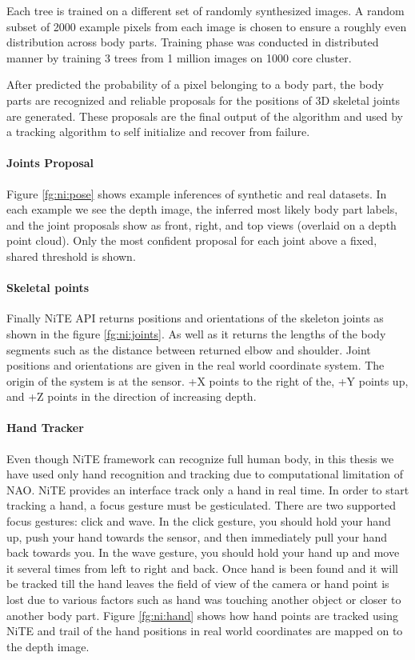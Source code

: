 

Each tree is trained on a different set of randomly synthesized images. A random subset of 2000 example pixels from each image is chosen to ensure a roughly even distribution across body parts. Training phase was conducted in distributed manner by training 3 trees from 1 million images on 1000 core cluster.

After predicted the probability of a pixel belonging to a body part, the body parts are recognized and reliable proposals for the positions of 3D skeletal joints are generated. These proposals are the final output of the algorithm and used by a tracking algorithm to self initialize and recover from failure.



\paragraph*{Joints Proposal} Figure \ref{fg:ni:pose} shows example inferences of synthetic and real datasets. In each example we see the depth image, the inferred most likely body part labels, and the joint proposals show as front, right, and top views (overlaid on a depth point cloud). Only the most confident proposal for each joint above a fixed, shared threshold is shown.

\paragraph*{Skeletal points} Finally NiTE API returns positions and orientations of the skeleton joints as shown in the figure \ref{fg:ni:joints}. As well as it returns the lengths of the body segments such as the distance between returned elbow and shoulder. Joint positions and orientations are given in the real world coordinate system. The origin of the system is at the sensor. +X points to the right of the, +Y points up, and +Z points in the direction of increasing depth. 



\paragraph*{Hand Tracker} Even though NiTE framework can recognize full human body, in this thesis we have used only hand recognition and tracking due to computational limitation of NAO. NiTE provides an interface track only a hand in real time. In order to start tracking a hand, a focus gesture must be gesticulated. There are two supported focus gestures: click and wave. In the click gesture, you should hold your hand up, push your hand towards the sensor, and then immediately pull your hand back towards you. In the wave gesture, you should hold your hand up and move it several times from left to right and back. Once hand is been found and it will be tracked till the hand leaves the field of view of the camera or hand point is lost due to various factors such as hand was touching another object or closer to another body part. Figure \ref{fg:ni:hand} shows how hand points are tracked using NiTE and trail of the hand positions in real world coordinates are mapped on to the depth image.

